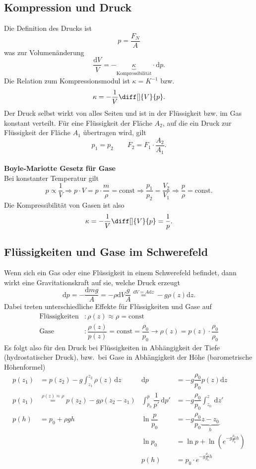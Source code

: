 \documentclass[a4paper,12pt]{article}
\newcommand{\td}{\,\text{d}}
\numberwithin{equation}{section}
\begin{document}
\subsection{Kompression und Druck}
Die Definition des Drucks ist 
\[ 
        p=\dfrac{F_N}{A}
\] 
was zur Volumenänderung
\[ 
        \dfrac{\text{d}V}{V}=-\underbrace{\kappa}_{\text{Kompressibilität}}\cdot \text{d}p
.\] 
Die Relation zum Kompressionsmodul ist $\kappa=K^{-1}$ bzw.
\[ 
        \kappa=-\dfrac{1}{V}\diff[]{V}{p}
.\] 
Der Druck selbst wirkt von alles Seiten und ist in der Flüssigkeit bzw. im Gas konstant verteilt. Für eine Flüssigkeit der Fläche $A_2$, auf die ein Druck zur Flüssigkeit der Fläche $A_1$ übertragen wird, gilt
\[ 
        p_1=p_2\qquad F_2=F_1\cdot \dfrac{A_2}{A_1} 
.\] 
\hfill\\\textbf{Boyle-Mariotte Gesetz für Gase}\\ 
Bei konstanter Temperatur gilt 
\[ 
        p\propto \dfrac{1}{V}\Rightarrow p\cdot V=p\cdot \dfrac{m}{\rho }=\text{const}\Rightarrow \dfrac{p_1}{p_2}=\dfrac{V_2}{V_1}\Rightarrow \dfrac{p}{\rho }=\text{const}
.\] 
Die Kompressibilität von Gasen ist also 
\[ 
        \kappa=-\dfrac{1}{V}\diff[]{V}{p}=\dfrac{1}{p}
.\] 

\subsection{Flüssigkeiten und Gase im Schwerefeld}
Wenn sich ein Gas oder eine Flüssigkeit in einem Schwerefeld befindet, dann wirkt eine Gravitationskraft auf sie, welche Druck erzeugt
\[ 
        \text{d}p=-\dfrac{\text{d}mg}{A}=-\rho \text{d}V\dfrac{g}{A}\stackrel{\text{d}V=A\text{d}z}{=}-g\rho \left(z\right)\text{d}z
.\] 
Dabei treten unterschiedliche Effekte für Flüssigkeiten und Gase auf
\begin{align*}
        \text{Flüssigkeiten}&:\rho \left(z\right)\approx \rho =\text{const}\\
        \text{Gase}&:\dfrac{\rho \left(z\right)}{p\left(z\right)}=\text{const}=\dfrac{\rho _0}{p_0}\rightarrow \rho \left(z\right)=p\left(z\right)\cdot \dfrac{\rho _0}{\rho _0}
\end{align*}
Es folgt also für den Druck bei Flüssigkeiten in Abhängigkeit der Tiefe (hydrostatischer Druck), bzw.\ bei Gase in Abhängigkeit der Höhe (barometrische Höhenformel)
\begin{align*}
        p\left(z_1\right)&=p\left(z_2\right)-g\int_{z_1}^{z_2}\rho \left(z\right)\td z&\text{d}p&=-g\dfrac{\rho _0}{p_0}p\left(z\right)\text{d}z\\
        p\left(z_1\right)&\stackrel{\rho \left(z\right)\approx \rho }{=}p\left(z_2\right)-g\rho \left(z_2-z_1\right)&\int_{p_0}^{p}\dfrac{1}{p'}\td p'&=-g\dfrac{\rho _0}{p_0}\int_{z_0}^{z}\td z'\\
        p\left(h\right)&=p_0+\rho gh&\ln \dfrac{p}{p_0}&=-g\dfrac{\rho _0}{p_0}\underbrace{z-z_0}_{h}\\
                       &&\ln p_0&=\ln p+\ln\left(e^{-g\tfrac{\rho _0}{p_0}h}\right)\\
                       &&p\left(h\right)&=p_0\cdot e^{-g\tfrac{\rho _0}{p_0}h}
\end{align*}
\end{document}
